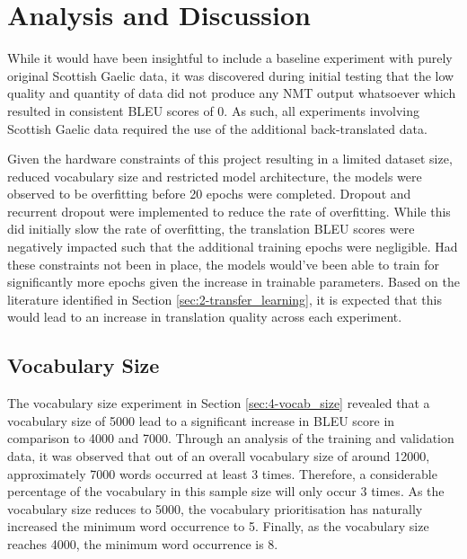 \chapter{Analysis and Discussion}

While it would have been insightful to include a baseline experiment with purely original Scottish Gaelic data, it was discovered during initial testing that the low quality and quantity of data did not produce any \acrshort{NMT} output whatsoever which resulted in consistent \acrshort{BLEU} scores of 0. As such, all experiments involving Scottish Gaelic data required the use of the additional back-translated data.

Given the hardware constraints of this project resulting in a limited dataset size, reduced vocabulary size and restricted model architecture, the models were observed to be overfitting before 20 epochs were completed. Dropout and recurrent dropout were implemented to reduce the rate of overfitting. While this did initially slow the rate of overfitting, the translation \acrshort{BLEU} scores were negatively impacted such that the additional training epochs were negligible. Had these constraints not been in place, the models would've been able to train for significantly more epochs given the increase in trainable parameters. Based on the literature identified in Section \ref{sec:2-transfer_learning}, it is expected that this would lead to an increase in translation quality across each experiment.

\section{Vocabulary Size}
The vocabulary size experiment in Section \ref{sec:4-vocab_size} revealed that a vocabulary size of 5000 lead to a significant increase in \acrshort{BLEU} score in comparison to 4000 and 7000. Through an analysis of the training and validation data, it was observed that out of an overall vocabulary size of around 12000, approximately 7000 words occurred at least 3 times. Therefore, a considerable percentage of the vocabulary in this sample size will only occur 3 times. As the vocabulary size reduces to 5000, the vocabulary prioritisation has naturally increased the minimum word occurrence to 5. Finally, as the vocabulary size reaches 4000, the minimum word occurrence is 8.

